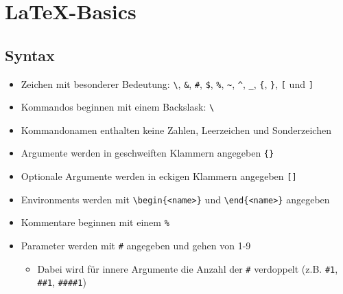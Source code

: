 \documentclass[
    ngerman,
    accentcolor=3b,
    dark_mode,
    fontsize= 12pt,
    a4paper,
    aspectratio=169,
    colorback=true,
    fancy_row_colors,
    leqno,
    fleqn,
    boxarc=3pt,
    fleqn,
]{algoslides}
\begin{document}
    \section{\LaTeX-Basics}\label{2}\label{LaTeX-Basics}
    \subsection{Syntax}
    \begin{frame}[fragile]
        \slidehead{}
        \begin{itemize}
            \item Zeichen mit besonderer Bedeutung: \verb+\+, \verb+&+, \verb+#+, \verb+$+, \verb+%+, \verb+~+, \verb+^+, \verb+_+, \verb+{+, \verb+}+, \verb+[+ und \verb+]+
            \item Kommandos beginnen mit einem Backslask: \verb+\+
            \item Kommandonamen enthalten keine Zahlen, Leerzeichen und Sonderzeichen
            \item Argumente werden in geschweiften Klammern angegeben \verb+{}+
            \item Optionale Argumente werden in eckigen Klammern angegeben \verb+[]+
            \item Environments werden mit \verb+\begin{<name>}+ und \verb+\end{<name>}+ angegeben
            \item Kommentare beginnen mit einem \verb+%+
            \item Parameter werden mit \verb+#+ angegeben und gehen von 1-9\begin{itemize}
                    \item Dabei wird für innere Argumente die Anzahl der \verb+#+ verdoppelt (z.B. \verb+#1+, \verb+##1+, \verb+####1+)
                \end{itemize}
        \end{itemize}
    \end{frame}
\end{document}
